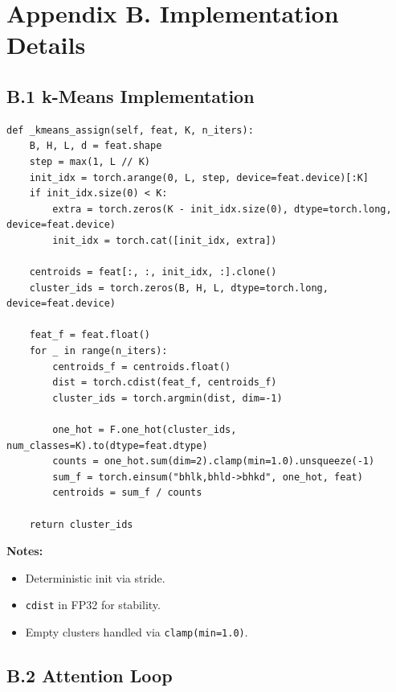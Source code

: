 
\section{Appendix B. Implementation Details}

\subsection{B.1 k-Means Implementation}

\begin{lstlisting}
def _kmeans_assign(self, feat, K, n_iters):
    B, H, L, d = feat.shape
    step = max(1, L // K)
    init_idx = torch.arange(0, L, step, device=feat.device)[:K]
    if init_idx.size(0) < K:
        extra = torch.zeros(K - init_idx.size(0), dtype=torch.long, device=feat.device)
        init_idx = torch.cat([init_idx, extra])

    centroids = feat[:, :, init_idx, :].clone()
    cluster_ids = torch.zeros(B, H, L, dtype=torch.long, device=feat.device)

    feat_f = feat.float()
    for _ in range(n_iters):
        centroids_f = centroids.float()
        dist = torch.cdist(feat_f, centroids_f)
        cluster_ids = torch.argmin(dist, dim=-1)

        one_hot = F.one_hot(cluster_ids, num_classes=K).to(dtype=feat.dtype)
        counts = one_hot.sum(dim=2).clamp(min=1.0).unsqueeze(-1)
        sum_f = torch.einsum("bhlk,bhld->bhkd", one_hot, feat)
        centroids = sum_f / counts

    return cluster_ids
\end{lstlisting}

\textbf{Notes:}
\begin{itemize}
\item Deterministic init via stride.
\item \texttt{cdist} in FP32 for stability.
\item Empty clusters handled via \texttt{clamp(min=1.0)}.

\end{itemize}
\subsection{B.2 Attention Loop}

